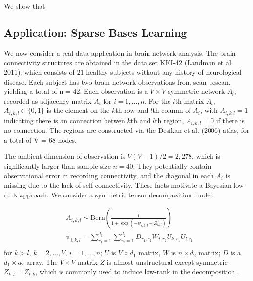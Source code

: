 \documentclass[10pt]{article}
\DeclareMathOperator{\1}{\mathbbm{1}}
\begin{document}
   We show that 


   \subsection{Application: Sparse Bases Learning}


   We now consider a real data application in brain network analysis. The brain connectivity structures are obtained in the data set KKI-42 (Landman et al. 2011), which consists of $21$ healthy subjects without any history of neurological disease. Each subject has two brain network observations from scan--rescan, yielding a total of n = 42. Each observation is a $V\times V$ symmetric network $A_i$, recorded as adjacency matrix $A_i$ for $i=1,\ldots,n$. For the $i$th matrix $A_i$, $A_{i,k,l} \in \{0,1\}$ is the element on the $k$th row and $l$th column of $A_i$, with $A_{i,k,l}=1$ indicating there is an connection betwen $k$th and $l$th region, $A_{i,k,l}=0$ if there is no connection. The regions are constructed via the Desikan et al. (2006) atlas, for a total of V = 68 nodes.

   The ambient dimension of observation is $V(V-1)/2=2,278$, which is significantly larger than sample size $n=40$. They potentially contain observational error in recording connectivity, and the  diagonal in each $A_{i}$ is missing due to the lack of self-connectivity. These facts motivate a Bayesian low-rank approach. We consider a symmetric tensor decomposition model:

   \begin{equation*}
   \begin{aligned}
   & A_{i,k,l} \sim \text{Bern}( \frac{1}{1+ \exp(-\psi_{i,k,l}- Z_{k,l})})\\
   & \psi_{i,k,l} = \sum_{r_1=1}^{d_1}\sum_{r_2=1}^{d_2} D_{r_1,r_2} W_{i,r_2} U_{k,r_1} U_{l,r_1}  \\
   \end{aligned}
   \end{equation*}
   for $k>l$, $k=2,\ldots, V$, $i=1,\ldots,n$; $U$ is $V\times d_1$ matrix, $W$ is $n\times d_2$ matrix; $D$ is a $d_1\times d_2$ array. The  $V\times V$ matrix $Z$ is almost unstructural except symmetric $Z_{k,l}=Z_{l,k}$, which is commonly used to induce low-rank in the decomposition \citep{durante2016nonparametric}.
\end{document}
